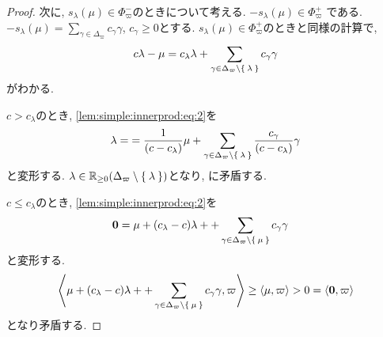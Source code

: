 \begin{proof}
  次に, $s_\lambda(\mu)\in\Phi_{\varpi}^-$のときについて考える.
  $-s_\lambda(\mu)\in\Phi_{\varpi}^+$
  である.
  $-s_\lambda(\mu)=\sum_{\gamma\in\Delta_{\varpi}}c_\gamma\gamma$,
  $c_\gamma\geq 0$とする.
  $s_\lambda(\mu)\in\Phi_{\varpi}^+$のときと同様の計算で,
  \begin{align}
    \label{lem:simple:innerprod:eq:2}
    c\lambda-\mu
    =c_\lambda\lambda+\sum_{\gamma\in\Delta_{\varpi}\setminus\Set{\lambda}}c_\gamma\gamma
  \end{align}
  がわかる.

  $c>c_\lambda$のとき,
  \cref{lem:simple:innerprod:eq:2}を
  \begin{align*}
    \lambda=
    &=\frac{1}{(c-c_\lambda)}\mu+
    \sum_{\gamma\in\Delta_{\varpi}\setminus\Set{\lambda}}\frac{c_\gamma}{(c-c_\lambda)}\gamma\\
  \end{align*}
  と変形する.
  $\lambda\in \mathbb{R}_{\geq 0}(\Delta_{\varpi}\setminus\Set{\lambda})$となり,
  に矛盾する.

  $c\leq c_\lambda$のとき,
  \cref{lem:simple:innerprod:eq:2}を
  \begin{align*}
    \boldsymbol{0}
    &=\mu+(c_\lambda-c)\lambda++\sum_{\gamma\in\Delta_{\varpi}\setminus\Set{\mu}}c_\gamma\gamma
  \end{align*}
  と変形する.
  \begin{align*}
    \Braket{\mu+(c_\lambda-c)\lambda++\sum_{\gamma\in\Delta_{\varpi}\setminus\Set{\mu}}c_\gamma\gamma,\varpi}
    \geq \Braket{\mu,\varpi}>0=
    \Braket{\boldsymbol{0},\varpi}
  \end{align*}
  となり矛盾する.
\end{proof}



